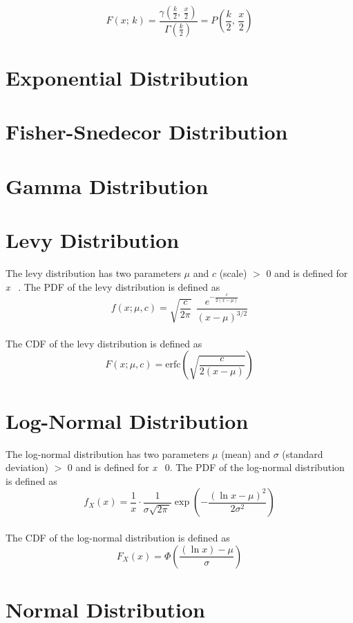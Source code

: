 		$$F(x;\,k) = \frac{\gamma(\frac{k}{2},\,\frac{x}{2})}{\Gamma(\frac{k}{2})} = P\left(\frac{k}{2},\,\frac{x}{2}\right)$$


	\section{Exponential Distribution}

	\section{Fisher-Snedecor Distribution}

	\section{Gamma Distribution}

	\section{Levy Distribution}
	
		The levy distribution has two parameters $\mu$ and $c$ (scale) $>$ 0 and is defined for \textit{x} \geq\ \mu. The \ac{PDF} of the levy distribution is defined as
		\\
		$$f(x;\mu,c)=\sqrt{\frac{c}{2\pi}}~~\frac{e^{ -\frac{c}{2(x-\mu)}}} {(x-\mu)^{3/2}}$$
		\\
		The \ac{CDF} of the levy distribution is defined as
		\\
		$$F(x;\mu,c)=\textrm{erfc}\left(\sqrt{\frac{c}{2(x-\mu)}}\right)$$

	\section{Log-Normal Distribution}
	
		The log-normal distribution has two parameters $\mu$ (mean) and $\sigma$ (standard deviation) $>$ 0 and is defined for \textit{x} \geq\ 0. The \ac{PDF} of the log-normal distribution is defined as
		\\
		$$f_X(x) = \frac 1 x \cdot \frac 1 {\sigma\sqrt{2\pi\,}} \exp\left( -\frac{(\ln x-\mu)^2}{2\sigma^2} \right)$$
		\\
		The \ac{CDF} of the log-normal distribution is defined as
		\\
		$$F_X(x) = \Phi\left( \frac{(\ln x) - \mu} \sigma \right)$$

	\section{Normal Distribution}
	
